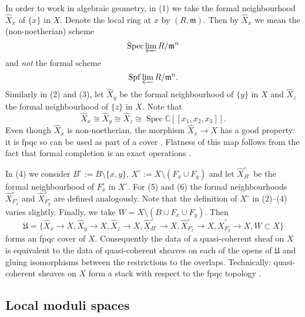 \documentclass{amsart}
\theoremstyle{definition}
\newcommand{\CC} {\mathbb{C}}          %
\newcommand{\Spec}{\operatorname{Spec}}
\begin{document}
In order to work in algebraic geometry, in (1) we take the formal neighbourhood $\widehat{X}_x$ of $\{x\}$ in $X$. Denote the local ring at $x$ by $(R,\mathfrak{m})$. Then by $\widehat{X}_x$ we mean the (non-noetherian) scheme
$$
\Spec \varprojlim R / \mathfrak{m}^n 
$$
and \emph{not} the formal scheme $$\mathrm{Spf} \varprojlim R / \mathfrak{m}^n.$$ Similarly in (2) and (3), let $\widehat{X}_y$ be the formal neighbourhood of $\{y\}$ in $X$ and $\widehat{X}_z$ the formal neighbourhood of $\{z\}$ in $X$. Note that 
$$
\widehat{X}_x \cong \widehat{X}_y \cong \widehat{X}_z \cong\Spec \CC[\![x_1,x_2,x_3]\!].
$$
Even though $\widehat{X}_x$ is non-noetherian, the morphism $\widehat{X}_x \rightarrow X$ has a good property: it is fpqc so can be used as part of a cover \cite[Sect.~2.3.2]{Vis}. Flatness of this map follows from the fact that formal completion is an exact operations \cite[Prop.~10.12, 10.13]{AM}. 

In (4) we consider $B^\circ := B \setminus \{x,y\}$, $X^\circ := X \setminus (F_x  \cup F_y)$ and let $\widehat{X}^{\circ}_{B^\circ}$ be the formal neighbourhood of $F_{x}^{\circ}$ in $X^\circ$. For (5) and (6) the formal neighbourhoods $\widehat{X}^{\circ}_{F_{x}^{\circ}}$ and $\widehat{X}^{\circ}_{F_{y}^{\circ}}$ are defined analogously. Note that the definition of $X^\circ$ in (2)--(4) varies slightly. Finally, we take $W = X \setminus (B \cup F_x \cup F_y)$. Then
$$
\mathfrak{U} = \{\widehat{X}_x \rightarrow X, \widehat{X}_y \rightarrow X, \widehat{X}_z \rightarrow X, \widehat{X}^{\circ}_{B^\circ} \rightarrow X, \widehat{X}^{\circ}_{F_{x}^{\circ}} \rightarrow X, \widehat{X}^{\circ}_{F_{y}^{\circ}} \rightarrow X, W \subset X\}
$$
forms an fpqc cover of $X$. Consequently the data of a quasi-coherent sheaf on $X$ is equivalent to the data of quasi-coherent sheaves on each of the opens of $\mathfrak{U}$ and gluing isomorphisms between the restrictions to the overlaps. Technically: quasi-coherent sheaves on $X$ form a stack with respect to the fpqc topology \cite[Thm.~4.23]{Vis}.


\subsection{Local moduli spaces} \label{localmod}
\end{document}
